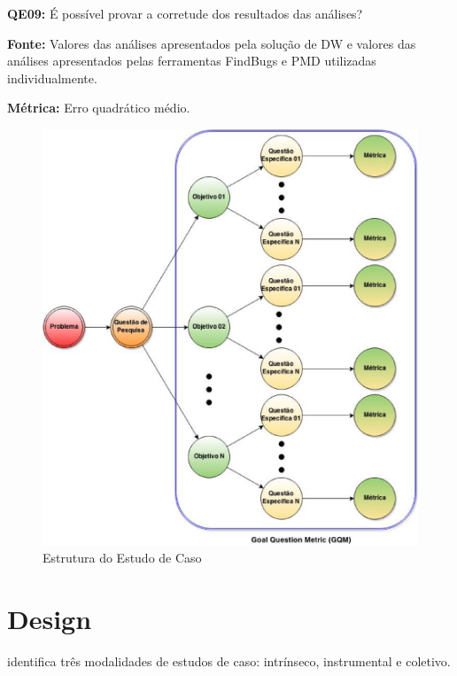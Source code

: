 
\textbf{QE09: } É possível provar a corretude dos resultados das análises? 

\textbf{Fonte:} Valores das análises apresentados pela solução de DW e valores das análises apresentados pelas ferramentas FindBugs e PMD utilizadas individualmente.
 
\textbf{Métrica:} Erro quadrático médio.\\

	
\begin{figure}[h!]
\centering
\includegraphics[keepaspectratio=false,scale=0.5]{figuras/figuras_nilton/EstruturaEstudoCaso.eps}
\caption{Estrutura do Estudo de Caso}
\label{EstruturaEstudoCaso}
\end{figure}


\section{Design}
\label{sec:design} 

 identifica três modalidades de estudos de caso: intrínseco, instrumental e coletivo. 

